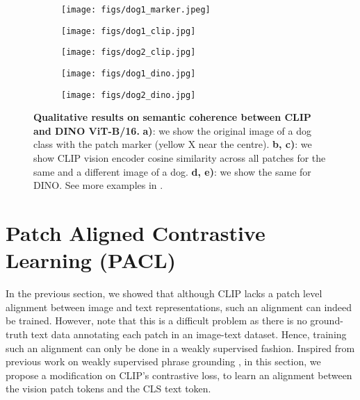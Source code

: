 \documentclass[10pt,twocolumn,letterpaper]{article}
\begin{document}
\begin{figure}[!t]
\centering
    \begin{subfigure}{0.18\linewidth}
        \centering
        \texttt{[image: figs/dog1\_marker.jpeg]}
        \caption{}
        \label{subfig:original_qualitative}
\end{subfigure}
    \begin{subfigure}{0.18\linewidth}
        \centering
        \texttt{[image: figs/dog1\_clip.jpg]}
        \caption{}
        \label{subfig:clip_coherence_same_image}
\end{subfigure}
    \begin{subfigure}{0.20\linewidth}
        \centering
        \texttt{[image: figs/dog2\_clip.jpg]}
        \caption{}
        \label{subfig:clip_coherence_diff_image}
\end{subfigure}
    \begin{subfigure}{0.18\linewidth}
        \centering
        \texttt{[image: figs/dog1\_dino.jpg]}
        \caption{}
        \label{subfig:dino_coherence_same_image}
\end{subfigure}
    \begin{subfigure}{0.20\linewidth}
        \centering
        \texttt{[image: figs/dog2\_dino.jpg]}
        \caption{}
        \label{subfig:dino_coherence_diff_image}
\end{subfigure}
    \vspace{-2mm}
    \caption{\textbf{Qualitative results on semantic coherence between CLIP and DINO ViT-B/16.} \textbf{a)}: we show the original image of a dog class with the patch marker (yellow X near the centre). \textbf{b, c)}: we show CLIP vision encoder cosine similarity across all patches for the same and a different image of a dog. \textbf{d, e)}: we show the same for DINO. See more examples in .}
    \vspace{-4mm}
    \label{fig:coherence_qualitative}
\end{figure}

\vspace{-2mm}
\section{Patch Aligned Contrastive Learning (PACL)}
\label{sec:pacl}

In the previous section, we showed that although CLIP lacks a patch level alignment between image and text representations, such an alignment can indeed be trained. However, note that this is a difficult problem as there is no ground-truth text data annotating each patch in an image-text dataset. Hence, training such an alignment can only be done in a weakly supervised fashion. Inspired from previous work on weakly supervised phrase grounding \cite{gupta2020contrastive}, in this section, we propose a modification on CLIP's contrastive loss, to learn an alignment between the vision patch tokens and the CLS text token.
\end{document}
